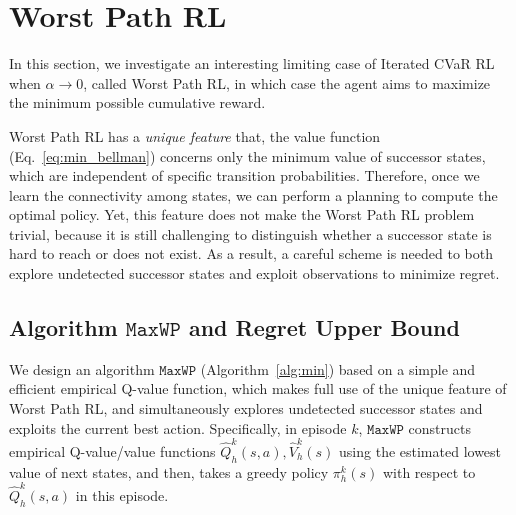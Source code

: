 \documentclass{article} %
\newcommand{\algmin}{\mathtt{MaxWP}}
\newcommand{\revision}[1]{{\color{black} #1}}
\begin{document}
	\vspace*{-0.5em}
	\section{Worst Path RL}
	
	In this section, we investigate an interesting limiting case of Iterated CVaR RL when $\alpha \to 0$, called Worst Path RL, in which case the agent aims to maximize the minimum possible cumulative reward.
	
	
	Worst Path RL has a \emph{unique feature} that, the value function (Eq.~\eqref{eq:min_bellman}) concerns only the minimum value of successor states, which are independent of specific transition probabilities. 
	Therefore, once we learn the connectivity among states, we can perform a planning to compute the optimal policy. 
	Yet, this feature does not make the Worst Path RL problem trivial, because it is still challenging to distinguish whether a successor state is hard to reach or does not exist. As a result, a careful scheme is needed to both explore undetected successor states and exploit observations to minimize regret.
	
	\vspace*{-0.5em}
	\subsection{Algorithm $\algmin$ and Regret Upper Bound}
	
	\revision{We design an algorithm $\algmin$ (Algorithm~\ref{alg:min}) based on a simple and efficient empirical Q-value function,
		which makes full use of the unique feature of Worst Path RL, and simultaneously explores undetected successor states and exploits the current best action.}
	Specifically, in episode $k$, $\algmin$ constructs empirical Q-value/value functions $\hat{Q}^k_h(s,a), \hat{V}^k_h(s)$ using the estimated lowest value of next states, and then, takes a greedy policy $\pi^k_h(s)$ with respect to $\hat{Q}^k_h(s,a)$ in this episode.
	
\end{document}
